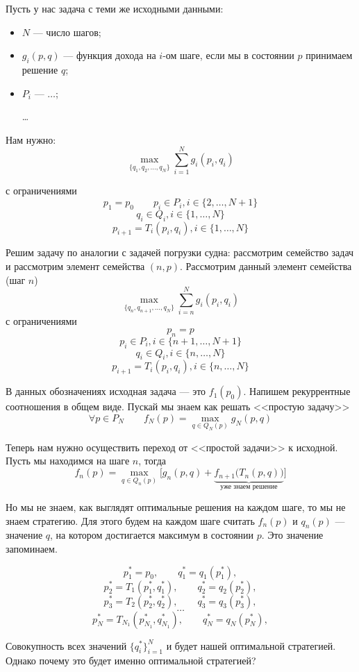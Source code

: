 Пусть у нас задача с теми же исходными данными:

\begin{itemize}
	\item $N$ --- число шагов;
	
	\item $g_i(p, q)$ --- функция дохода на $i$-ом шаге, если мы в состоянии $p$ принимаем решение $q$;
	
	\item $P_i$ --- $\dots$;
	
	\dots
\end{itemize}

Нам нужно:
\[
	\max_{\{q_1, q_2, \dots, q_N\}} \sum_{i=1}^{N} g_i(p_i, q_i)
\]

с ограничениями
\[
	p_1 = p_0 \qquad p_i \in P_i, i \in \{2, \dots, N+1\}
\]
\[
	q_i \in Q_i, i \in \{1, \dots, N\}
\]
\[
	p_{i+1} = T_i(p_i, q_i), i \in \{1, \dots, N\}
\]

Решим задачу по аналогии с задачей погрузки судна: рассмотрим семейство задач и рассмотрим элемент семейства $(n, p)$. Рассмотрим данный элемент семейства (шаг $n$)
\[
	\max_{\{q_n, q_{n+1}, \dots, q_N\}} \sum_{i=n}^{N} g_i(p_i, q_i)
\]
с ограничениями
\[
	p_n = p
\]
\[
	p_i \in P_i, i \in \{n+1, \dots, N+1\}
\]
\[
	q_i \in Q_i, i \in \{n, \dots, N\}
\]
\[
	p_{i+1} = T_i(p_i, q_i), i \in \{n, \dots, N\}
\]

В данных обозначениях исходная задача --- это $f_1(p_0)$. Напишем рекуррентные соотношения в общем виде. Пускай мы знаем как решать <<простую задачу>>
\[
	\forall p \in P_{N} \qquad f_N(p) = \max_{q \in Q_{N}(p)} g_N(p, q)
\]

Теперь нам нужно осуществить переход от <<простой задачи>> к исходной. Пусть мы находимся на шаге $n$, тогда
\[
	f_n(p) = \max_{q \in Q_{n}(p)} \Big[g_n(p, q) + \underbrace{f_{n+1}\big(T_{n}(p, q)\big)}_{\text{уже знаем решение}}\Big]
\]

Но мы не знаем, как выглядят оптимальные решения на каждом шаге, то мы не знаем стратегию. Для этого будем на каждом шаге считать $f_n(p)$ и $q_n(p)$ --- значение $q$, на котором достигается максимум в состоянии $p$. Это значение запоминаем.

\[
	p_1^* = p_0, \qquad q_1^* = q_1(p_1^*),
\]
\[
	p_2^* = T_1(p_1^*, q_1^*), \qquad q_2^* = q_2(p_2^*),
\]
\[
	p_3^* = T_2(p_2^*, q_2^*), \qquad q_3^* = q_3(p_3^*),
\]
\[
	\dots
\]
\[
	p_N^* = T_{N_1}(p_{N_1}^*, q_{N_1}^*), \qquad q_N^* = q_N(p_N^*),
\]

Совокупность всех значений $\{q_i^*\}_{i=1}^{N}$ и будет нашей оптимальной стратегией. Однако почему это будет именно оптимальной стратегией?

